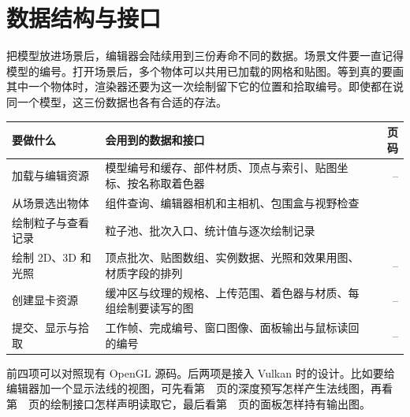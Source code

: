 \clearpage
\section{数据结构与接口}\label{sec:data-guide}
把模型放进场景后，编辑器会陆续用到三份寿命不同的数据。场景文件要一直记得模型的编号。打开场景后，多个物体可以共用已加载的网格和贴图。等到真的要画其中一个物体时，渲染器还要为这一次绘制留下它的位置和拾取编号。即使都在说同一个模型，这三份数据也各有合适的存法。

\noindent\begin{tabularx}{\linewidth}{@{}L{41mm}Y r@{}}
\toprule
要做什么 & 会用到的数据和接口 & 页码\\\midrule
加载与编辑资源 & 模型编号和缓存、部件材质、顶点与索引、贴图坐标、按名称取着色器 & \pageref{sec:data-assets}--\pageref{sec:data-atlas}\\
从场景选出物体 & 组件查询、编辑器相机和主相机、包围盒与视野检查 & \pageref{sec:data-scene}\\
绘制粒子与查看记录 & 粒子池、批次入口、统计值与逐次绘制记录 & \pageref{sec:data-observe}\\
绘制 2D、3D 和光照 & 顶点批次、贴图数组、实例数据、光照和效果用图、材质字段的排列 & \pageref{sec:data-renderer}--\pageref{sec:data-material}\\
创建显卡资源 & 缓冲区与纹理的规格、上传范围、着色器与材质、每组绘制要读写的图 & \pageref{sec:data-device}--\pageref{sec:data-targets}\\
提交、显示与拾取 & 工作帧、完成编号、窗口图像、面板输出与鼠标读回的编号 & \pageref{sec:data-frame}--\pageref{sec:data-pick}\\
\bottomrule
\end{tabularx}

前四项可以对照现有 OpenGL 源码。后两项是接入 Vulkan 时的设计。比如要给编辑器加一个显示法线的视图，可先看第~\pageref{sec:data-effects}~页的深度预写怎样产生法线图，再看第~\pageref{sec:data-targets}~页的绘制接口怎样声明读取它，最后看第~\pageref{sec:data-pick}~页的面板怎样持有输出图。
